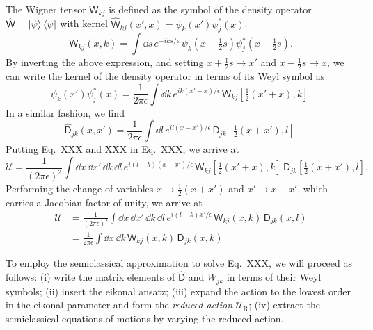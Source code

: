 The Wigner tensor $\mathsf{W}_{kj}$ is defined as the symbol of the density operator $\hat{\mathsf{W}} = \mathinner{\lvert{\psi}\rangle}\mathinner{\langle{\psi}\rvert}$ with kernel $\hat{\mathsf{W}}_{kj}(x',x) = \psi_{k}(x')\psi_{j}^{*}(x)$.
%
\begin{equation}
  \mathsf{W}_{kj}(x, k) = \int \dd{s}\, e^{-iks/\epsilon}\, \psi_{k}\left(x + \tfrac{1}{2}s\right)\psi^{*}_{j}\left(x - \tfrac{1}{2}s\right).
\end{equation}
%
By inverting the above expression, and setting $x + \frac{1}{2}s \to x'$ and $x- \frac{1}{2}s \to x$, we can write the kernel of the density operator in terms of its Weyl symbol as
%
%
\begin{equation}
  \psi_{k}(x') \psi^{*}_{j}(x) = \frac{1}{2\pi \epsilon} \int \dd{k}\, e^{ik(x' -x)/\epsilon}\,\mathsf{W}_{kj}\left[\tfrac{1}{2}(x' + x), k\right].
\end{equation}
%
In a similar fashion, we find
%
\begin{equation}
  \hat{\mathsf{D}}_{jk}(x, x') = \frac{1}{2\pi\epsilon} \int \dd{l}\, e^{il(x -x')/\epsilon}\,\mathsf{D}_{jk}\left[\tfrac{1}{2}(x + x'), l\right].
\end{equation}
%
Putting Eq.~XXX and XXX in Eq.~XXX, we arrive at
%
\begin{equation}
  \mathscr{U} = \frac{1}{(2\pi\epsilon)^{2}}\int \dd{x}\,\dd{x'}\,\dd{k}\,\dd{l}\, e^{i(l-k)(x -x')/\epsilon}\,\mathsf{W}_{kj}\left[\tfrac{1}{2}(x' + x), k\right]\, \mathsf{D}_{jk}\left[\tfrac{1}{2}(x + x'), l\right].
\end{equation}
%
Performing the change of variables $x \to \frac{1}{2}(x + x')$ and $x' \to x - x'$, which carries a Jacobian factor of unity, we arrive at
%
\begin{equation}
  \begin{aligned}
    \mathscr{U} &= \frac{1}{(2\pi\epsilon)^{2}}\int \dd{x}\,\dd{x'}\,\dd{k}\,\dd{l}\, e^{i(l-k)x'/\epsilon}\,\mathsf{W}_{kj}(x, k)\, \mathsf{D}_{jk}(x, l)\\
                &= \frac{1}{2\pi\epsilon}\int \dd{x}\,\dd{k}\,\mathsf{W}_{kj}(x,k)\,\mathsf{D}_{jk}(x, k)
  \end{aligned}
\end{equation}
%


To employ the semiclassical approximation to solve Eq.~XXX, we will proceed as follows: (i) write the matrix elements of $\hat{\mathsf{D}}$ and $W_{jk}$ in terms of their Weyl symbols; (ii) insert the eikonal ansatz; (iii) expand the action to the lowest order in the eikonal parameter and form the \emph{reduced action} $\mathscr{U}_{\text{R}}$; (iv) extract the semiclassical equations of motions by varying the reduced action.

